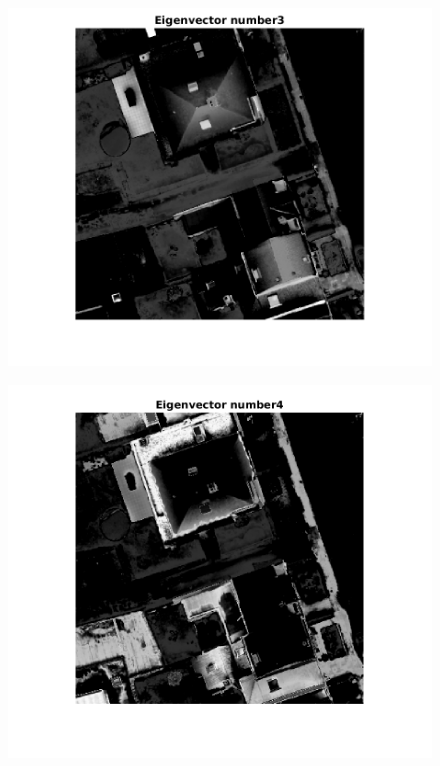 \begin{figure}
\includegraphics[width=\linewidth]{evec3.png}
\end{figure}

\begin{figure}
\includegraphics[width=\linewidth]{evec4.png}
\end{figure}

